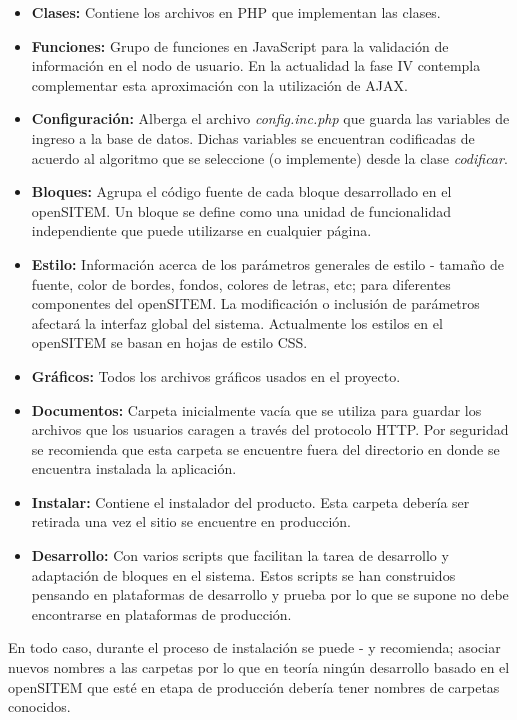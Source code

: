 \begin{itemize}
 \item \textbf{Clases:} Contiene los archivos en PHP que implementan las clases. 
\item \textbf{Funciones:} Grupo de funciones en JavaScript para la validación de información en el nodo de usuario. En la actualidad la fase IV contempla complementar esta aproximación con la utilización de AJAX.
\item \textbf{Configuración:} Alberga el archivo \textit{config.inc.php} que guarda las variables de ingreso a la base de datos. Dichas variables se encuentran codificadas de acuerdo al algoritmo que se seleccione (o implemente) desde la clase \textit{codificar}.
\item \textbf{Bloques:} Agrupa el código fuente de cada bloque desarrollado en el openSITEM. Un bloque se define como una unidad de funcionalidad independiente que puede utilizarse en cualquier página.
\item \textbf{Estilo:} Información acerca de los parámetros generales de estilo - tamaño de fuente, color de bordes, fondos, colores de letras, etc; para diferentes componentes del openSITEM. La modificación o inclusión de parámetros afectará la interfaz global del sistema. Actualmente los estilos en el openSITEM se basan en hojas de estilo CSS.
\item \textbf{Gráficos:} Todos los archivos gráficos usados en el proyecto.
\item \textbf{Documentos:} Carpeta inicialmente vacía que se utiliza para guardar los archivos que los usuarios caragen a través del protocolo HTTP. Por seguridad se recomienda que esta carpeta se encuentre fuera del directorio en donde se encuentra instalada la aplicación.
\item \textbf{Instalar:} Contiene el instalador del producto. Esta carpeta debería ser retirada una vez el sitio se encuentre en producción.
\item \textbf{Desarrollo:} Con varios scripts que facilitan la tarea de desarrollo y adaptación de bloques en el sistema. Estos scripts se han construidos pensando en plataformas de desarrollo y prueba por lo que se supone no debe encontrarse en plataformas de producción.
\end{itemize}

En todo caso, durante el proceso de instalación se puede - y recomienda; asociar nuevos nombres a las carpetas por lo que en teoría ningún desarrollo basado en el openSITEM que esté en etapa de producción debería tener nombres de carpetas conocidos.

